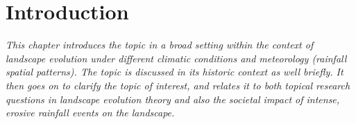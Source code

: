 \chapter{Introduction}
\label{chapter_intro}


\textit{This chapter introduces the topic in a broad setting within the context of landscape evolution under different climatic conditions and meteorology (rainfall spatial patterns). The topic is discussed in its historic context as well briefly. It then goes on to clarify the topic of interest, and relates it to both topical research questions in landscape evolution theory and also the societal impact of intense, erosive rainfall events on the landscape.}